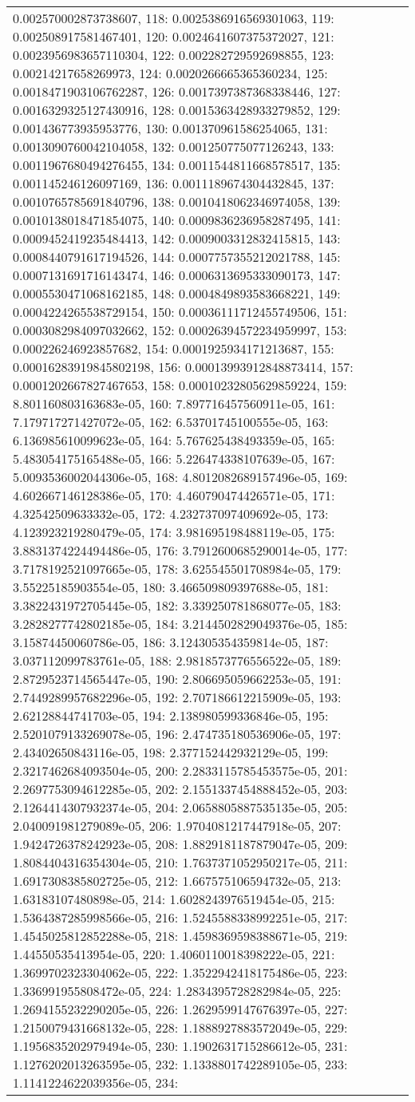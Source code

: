 \begin{tabular}{lrl}
0.002570002873738607, 118: 0.0025386916569301063, 119: 0.002508917581467401, 120: 0.0024641607375372027, 121: 0.0023956983657110304, 122: 0.002282729592698855, 123: 0.00214217658269973, 124: 0.0020266665365360234, 125: 0.0018471903106762287, 126: 0.0017397387368338446, 127: 0.0016329325127430916, 128: 0.0015363428933279852, 129: 0.001436773935953776, 130: 0.001370961586254065, 131: 0.0013090760042104058, 132: 0.001250775077126243, 133: 0.0011967680494276455, 134: 0.0011544811668578517, 135: 0.001145246126097169, 136: 0.0011189674304432845, 137: 0.0010765785691840796, 138: 0.0010418062346974058, 139: 0.0010138018471854075, 140: 0.0009836236958287495, 141: 0.0009452419235484413, 142: 0.0009003312832415815, 143: 0.0008440791617194526, 144: 0.0007757355212021788, 145: 0.0007131691716143474, 146: 0.0006313695333090173, 147: 0.0005530471068162185, 148: 0.0004849893583668221, 149: 0.0004224265538729154, 150: 0.00036111712455749506, 151: 0.0003082984097032662, 152: 0.00026394572234959997, 153: 0.000226246923857682, 154: 0.0001925934171213687, 155: 0.00016283919845802198, 156: 0.00013993912848873414, 157: 0.0001202667827467653, 158: 0.00010232805629859224, 159: 8.801160803163683e-05, 160: 7.897716457560911e-05, 161: 7.179717271427072e-05, 162: 6.53701745100555e-05, 163: 6.136985610099623e-05, 164: 5.767625438493359e-05, 165: 5.483054175165488e-05, 166: 5.226474338107639e-05, 167: 5.0093536002044306e-05, 168: 4.8012082689157496e-05, 169: 4.602667146128386e-05, 170: 4.460790474426571e-05, 171: 4.32542509633332e-05, 172: 4.232737097409692e-05, 173: 4.123923219280479e-05, 174: 3.981695198488119e-05, 175: 3.8831374224494486e-05, 176: 3.7912600685290014e-05, 177: 3.7178192521097665e-05, 178: 3.625545501708984e-05, 179: 3.55225185903554e-05, 180: 3.466509809397688e-05, 181: 3.3822431972705445e-05, 182: 3.339250781868077e-05, 183: 3.2828277742802185e-05, 184: 3.2144502829049376e-05, 185: 3.15874450060786e-05, 186: 3.124305354359814e-05, 187: 3.037112099783761e-05, 188: 2.9818573776556522e-05, 189: 2.8729523714565447e-05, 190: 2.806695059662253e-05, 191: 2.7449289957682296e-05, 192: 2.707186612215909e-05, 193: 2.62128844741703e-05, 194: 2.138980599336846e-05, 195: 2.5201079133269078e-05, 196: 2.474735180536906e-05, 197: 2.43402650843116e-05, 198: 2.377152442932129e-05, 199: 2.3217462684093504e-05, 200: 2.2833115785453575e-05, 201: 2.2697753094612285e-05, 202: 2.1551337454888452e-05, 203: 2.1264414307932374e-05, 204: 2.0658805887535135e-05, 205: 2.040091981279089e-05, 206: 1.9704081217447918e-05, 207: 1.9424726378242923e-05, 208: 1.8829181187879047e-05, 209: 1.8084404316354304e-05, 210: 1.7637371052950217e-05, 211: 1.6917308385802725e-05, 212: 1.667575106594732e-05, 213: 1.63183107480898e-05, 214: 1.6028243976519454e-05, 215: 1.5364387285998566e-05, 216: 1.5245588338992251e-05, 217: 1.4545025812852288e-05, 218: 1.4598369598388671e-05, 219: 1.44550535413954e-05, 220: 1.4060110018398222e-05, 221: 1.3699702323304062e-05, 222: 1.3522942418175486e-05, 223: 1.336991955808472e-05, 224: 1.2834395728282984e-05, 225: 1.2694155232290205e-05, 226: 1.2629599147676397e-05, 227: 1.2150079431668132e-05, 228: 1.1888927883572049e-05, 229: 1.1956835202979494e-05, 230: 1.1902631715286612e-05, 231: 1.1276202013263595e-05, 232: 1.1338801742289105e-05, 233: 1.1141224622039356e-05, 234: 
\end{tabular}
